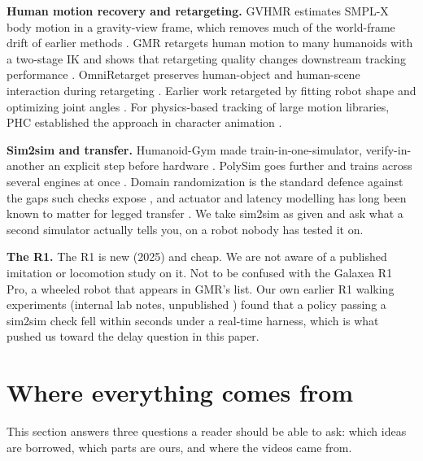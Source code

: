 \documentclass[11pt]{article}
\begin{document}
\textbf{Human motion recovery and retargeting.} GVHMR estimates SMPL-X \cite{smplx} body motion in a gravity-view frame, which removes much of the world-frame drift of earlier methods \cite{gvhmr}. GMR retargets human motion to many humanoids with a two-stage IK and shows that retargeting quality changes downstream tracking performance \cite{gmr}. OmniRetarget preserves human-object and human-scene interaction during retargeting \cite{omniretarget}. Earlier work retargeted by fitting robot shape and optimizing joint angles \cite{h2o}. For physics-based tracking of large motion libraries, PHC established the approach in character animation \cite{phc}.

\textbf{Sim2sim and transfer.} Humanoid-Gym made train-in-one-simulator, verify-in-another an explicit step before hardware \cite{humanoidgym}. PolySim goes further and trains across several engines at once \cite{polysim}. Domain randomization is the standard defence against the gaps such checks expose \cite{tobin,peng}, and actuator and latency modelling has long been known to matter for legged transfer \cite{hwangbo}. We take sim2sim as given and ask what a second simulator actually tells you, on a robot nobody has tested it on.

\textbf{The R1.} The R1 is new (2025) and cheap. We are not aware of a published imitation or locomotion study on it. Not to be confused with the Galaxea R1 Pro, a wheeled robot that appears in GMR's list. Our own earlier R1 walking experiments (internal lab notes, unpublished \cite{internal}) found that a policy passing a sim2sim check fell within seconds under a real-time harness, which is what pushed us toward the delay question in this paper.

\section{Where everything comes from}\label{sec:sources}
This section answers three questions a reader should be able to ask: which ideas are borrowed, which parts are ours, and where the videos came from.
\end{document}
